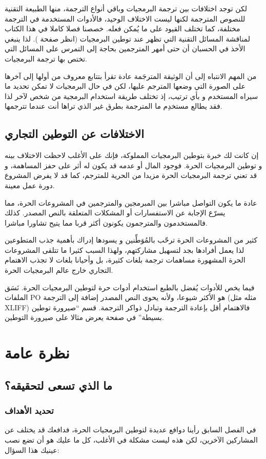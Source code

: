 لكن توجد اختلافات بين ترجمة البرمجيات وباقي أنواع الترجمة، منها الطبيعة
التقنية للنصوص المترجمة لكنها ليست الاختلاف الوحيد، فالأدوات المستخدمة
في الترجمة مختلفة، كما تختلف القيود على ما يُمكن فعله. خصصنا فصلا كاملا
في هذا الكتاب لمناقشة المسائل التقنية التي تظهر عند توطين البرمجيات
(انظر صفحة \at[ref:32352020]). لذا ينبغي الأخذ في الحسبان أن
حتى أمهر المترجمين بحاجة إلى التمرس على المسائل التي تختص بها ترجمة
البرمجيات.

من المهم الانتباه إلى أن الوثيقة المترجَمة عادة تقرأ بتتابع معروف من
أولها إلى آخرها على الصورة التي وضعها المترجم عليها، لكن في حال
البرمجيات لا تمكن تحديد ما سيراه المستخدم و بأي ترتيب، إذ تختلف طريقة
استخدام البرمجية من شخص لآخر لذا فقد يطالع مستخدِم ما المترجمة بطرق غير
الذي تراها أنت عندما تترجمها.

\section{الاختلافات عن التوطين التجاري}
إن كانت لك خبرة بتوطين البرمجيات المملوكة، فإنك على الأغلب لاحظت
الاختلاف بينه و توطين البرمجيات الحرة. فوجود المال أو عدمه قد يكون له
أثر على حفز المساهمة، و قد تعني ترجمة البرمجيات الحرة مزيدا من الحرية
للمترجم، كما قد لا يفرض المشروع دورة عمل معينة.

عادة ما يكون التواصل مباشرا بين المبرمجين والمترجمين في المشروعات الحرة،
مما يسرّع الإجابة عن الاستفسارات أو المشكلات المتعلقة بالنص المصدر.
كذلك فالمستخدمون والمترجمون يكونون أكثر قربا مما يتيح تشاورا مباشرا.

كثير من المشروعات الحرة ترحّب بالمُوَطِّنين و يسودها إدراك بأهمية جذب
المتطوعين لذا يعمل أفرادها بجد لتسهيل مشاركتهم، ولهذا السبب كثيرا ما
تتلقى المشروعات الحرة المشهورة مساهمات ترجمة بلغات كثيرة، بل وأحيانا
بلغات لا تجذب الاهتمام التجاري خارج عالم البرمجيات الحرة.

فيما يخص للأدوات يُفضل بالطبع استخدام أدوات حرة لتوطين البرمجيات الحرة.
نَسَق الملفات PO هو الأكثر شيوعا، ولأنه يحوى النص المصدر إضافة إلى
الترجمة (مثله مثل XLIFF) فالاهتمام أقل بإعادة الترجمة وتبادل ذواكر
الترجمة. قسم “صيرورة توطين بسيطة” في صفحة \at[ref:38565525]
يعرض مثالا على صيرورة التوطين.

\chapter{نظرة عامة}
\section{ما الذي تسعى لتحقيقه؟}
\subsection{تحديد الأهداف}
في الفصل السابق رأينا دوافع عديدة لتوطين البرمجيات الحرة، فدافعك قد
يختلف عن المشاركين الآخرين، لكن هذه ليست مشكلة في الأغلب، كل ما عليك هو
أن تضع نصب عينيك هذا السؤال:

